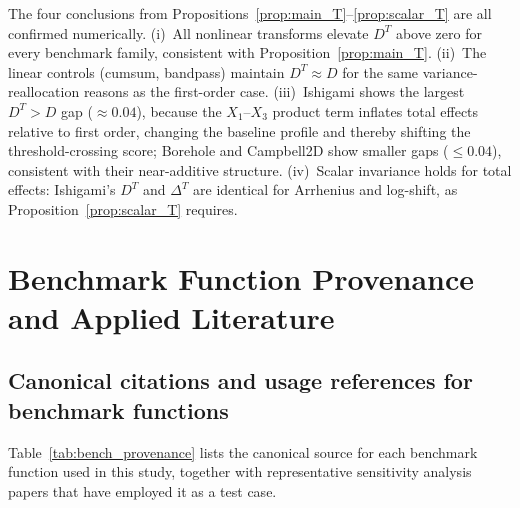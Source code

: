\documentclass[11pt,onecolumn]{article}
\begin{document}
The four conclusions from Propositions~\ref{prop:main_T}--\ref{prop:scalar_T}
are all confirmed numerically.  (i)~All nonlinear transforms elevate $D^T$
above zero for every benchmark family, consistent with Proposition~\ref{prop:main_T}.
(ii)~The linear controls (cumsum, bandpass) maintain $D^T \approx D$ for the
same variance-reallocation reasons as the first-order case.  (iii)~Ishigami
shows the largest $D^T > D$ gap ($\approx 0.04$), because the $X_1$--$X_3$ product term
inflates total effects relative to first order, changing the baseline profile
and thereby shifting the threshold-crossing score; Borehole and Campbell2D
show smaller gaps ($\leq 0.04$), consistent with their near-additive structure.
(iv)~Scalar invariance holds for total effects: Ishigami's $D^T$ and
$\Delta^T$ are identical for Arrhenius and log-shift, as Proposition~\ref{prop:scalar_T}
requires.

\section{Benchmark Function Provenance and Applied Literature}
\label{app:benchmarks}

\subsection{Canonical citations and usage references for benchmark functions}

Table~\ref{tab:bench_provenance} lists the canonical source for each benchmark
function used in this study, together with representative sensitivity analysis
papers that have employed it as a test case.
\end{document}
